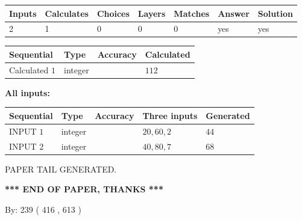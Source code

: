 \documentclass{ctexart}
\begin{document}
   
\noindent\begin{tabular}{|l|l|l|l|l|l|l|}
 \hline
Inputs & Calculates & Choices & Layers & Matches & Answer & Solution \\ \hline
 2  & 
 1  & 
 0
  & 
 0  & 
 0  & 
  yes & 
  yes 
  \\ \hline
 \end{tabular}
   
   
   
   
\noindent{}
   
   
  
  
\noindent\begin{tabular}{|l|l|l|l|}
\hline
 Sequential & Type & Accuracy & Calculated \\ 
\hline
 
 
  Calculated $  1 $ & integer &  & 
  $ 112 $ 
 \\  \hline  
 \end{tabular}
   
   
   
   
\noindent\vspace{0.1in}\hspace{-0.08in} {\textbf{\Large{All inputs: }}}
   
   
  
  
\noindent\begin{tabular}{|l|l|l|l|l|}
\hline
 Sequential & Type & Accuracy & Three inputs & Generated \\ 
\hline
 
 
  INPUT $  1 $ & integer &  & $
 20
 , 
 60
 , 
 2
 $ & $ 44 $ 
 \\  \hline  
 
 
  INPUT $  2 $ & integer &  & $
 40
 , 
 80
 , 
 7
 $ & $ 68 $ 
 \\  \hline  
 \end{tabular}
   
   
   
   
   
   
 \vspace{0.2in}
 
   
   
\vspace{2.0in} PAPER TAIL GENERATED.
   
   
   
   
\vspace{1.0in} 
{\textbf{\large{ *** END OF PAPER, THANKS *** }}} 
   
   
\hspace{1.0in} By: 
 239 ( 416 ,  613 )
   
\end{document}
